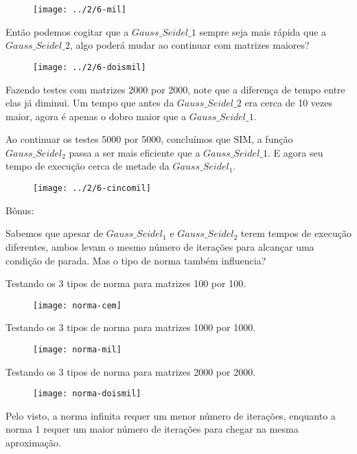 \documentclass[leqno]{article}
\numberwithin{equation}{section}
\begin{document}
\begin{enumerate}
\begin{sol}
		\begin{figure}[H]
			\centering
			\texttt{[image: ../2/6-mil]}
		\end{figure}
		
		Então podemos cogitar que a $Gauss\_Seidel\_1$ sempre seja mais rápida que a $Gauss\_Seidel\_2$, algo poderá mudar ao continuar com matrizes maiores?
		
		\begin{figure}[H]
			\centering
			\texttt{[image: ../2/6-doismil]}
		\end{figure}
		
		
		Fazendo testes com matrizes 2000 por 2000, note que a diferença de tempo entre elas já diminui. Um tempo que antes da $Gauss\_Seidel\_2$ era cerca de 10 vezes maior, agora é apenas o dobro maior que a $Gauss\_Seidel\_1$.
		
		Ao continuar os testes 5000 por 5000, concluímos que SIM, a função $Gauss\_Seidel_2$ passa a ser mais eficiente que a $Gauss\_Seidel\_1$. E agora seu tempo de execução cerca de metade da $Gauss\_Seidel_1$.
		
		\begin{figure}[H]
			\centering
			\texttt{[image: ../2/6-cincomil]}
		\end{figure}
	
		Bônus:
		
		Sabemos que apesar de $Gauss\_Seidel_1$ e $Gauss\_Seidel_2$ terem tempos de execução diferentes, ambos levam o mesmo número de iterações para alcançar uma condição de parada. Mas o tipo de norma também influencia?
		
		Testando os 3 tipos de norma para matrizes 100 por 100.
		
		\begin{figure}[H]
			\centering
			\texttt{[image: norma-cem]}
		\end{figure}
		
		Testando os 3 tipos de norma para matrizes 1000 por 1000.
		\begin{figure}[H]
			\centering
			\texttt{[image: norma-mil]}
		\end{figure}
		
		Testando os 3 tipos de norma para matrizes 2000 por 2000.
		
		\begin{figure}[H]
			\centering
			\texttt{[image: norma-doismil]}
		\end{figure}
		
		Pelo visto, a norma infinita requer um menor número de iterações, enquanto a norma 1 requer um maior número de iterações para chegar na mesma aproximação.
		 
		\end{sol}
		
		
	\end{enumerate}
\end{document}
